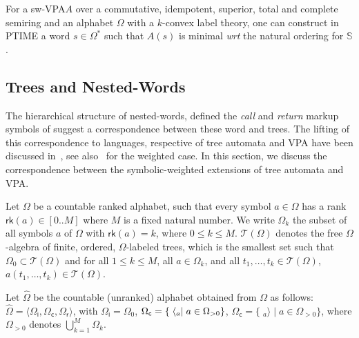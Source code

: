 \documentclass[runningheads]{llncs}
\def\wrt{\textit{wrt}\xspace}
\def\<#1>{\langle #1 \rangle}
\newcommand{\T}{\mathcal{T}}
\newcommand{\Semiring}{\mathbb{S}}
\def\SWVPA{\textsf{sw-VPA}\xspace}
\newcommand{\call}[1]{\ensuremath #1} %
\newcommand{\return}[1]{\ensuremath #1} %
\def\Omegai{{\Omega_\mathsf{i}}}
\def\Omegac{{\Omega_\mathsf{c}}}
\def\Omegar{{\Omega_\mathsf{r}}}
\newcommand{\rank}{\mathsf{rk}}
\begin{document}
\begin{proposition}
For a \SWVPA $A$ over a 
commutative, idempotent, superior, total and complete semiring 
and an alphabet $\Omega$ with a $k$-convex label theory,
one can construct in PTIME a word $s \in \Omega^*$ 
such that $A(s)$ is minimal \wrt the natural ordering for $\Semiring$. 
\end{proposition} 



\subsection{Trees and Nested-Words}
\label{sec:trees}
The hierarchical structure of nested-words, defined the \emph{call} and \emph{return} markup symbols of 
suggest a correspondence between these word and trees. 
The lifting of this correspondence to languages, respective of tree automata and VPA have
been discussed in~\cite{AlurMadhusudan09nested}, 
see also~\cite{Caralp12VPAmult} for the weighted case.
In this section, we discuss the correspondence between the symbolic-weighted extensions
of tree automata and VPA.

Let $\Omega$ be a countable ranked alphabet, such that 
every symbol $a \in \Omega$ has a rank 
$\rank(a) \in [0..M]$ where $M$ is a fixed natural number.
We write $\Omega_k$ the subset of all symbols $a$ of $\Omega$
with $\rank(a) = k$, where $0 \leq k \leq M$.
%
$\T(\Omega)$ denotes the free $\Omega$-algebra of finite, ordered, 
$\Omega$-labeled trees, 
which is the smallest set such that  $\Omega_0 \subset \T(\Omega)$
and for all $1 \leq k \leq M$, all $a \in \Omega_k$, 
and all $t_1, \ldots, t_k \in \T(\Omega)$, $a(t_1, \ldots, t_k) \in \T(\Omega)$.
%

\renewcommand{\call}[1]{\ensuremath \langle_{#1}}
\renewcommand{\return}[1]{\ensuremath {}_{#1}{\rangle}} %

Let $\hat\Omega$ be the countable (unranked) alphabet obtained from 
$\Omega$ as follows: 
$\hat\Omega = \< \Omegai, \Omegac, \Omegar >$, with
$\Omegai = \Omega_0$, 
$\Omegac = \{ \; \call{a} \mid a \in \Omega_{>0} \}$,
$\Omegac = \{ \; \return{a} \mid a \in \Omega_{>0} \}$,
where $\Omega_{>0}$ denotes $\bigcup_{k = 1}^{M} \Omega_k$.
\end{document}
